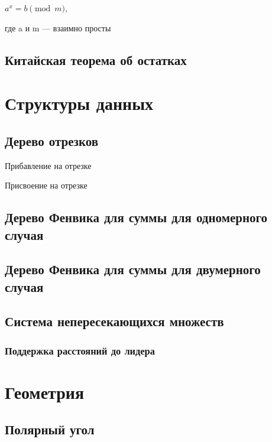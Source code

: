 \documentclass[a4paper]{article}
\begin{document}
\begin{multicols*}{2}
		$a^x = b \pmod m$, 
		
		где a и m — взаимно просты 
		
		\subsection{Китайская теорема об остатках}
		
		
		\section{Структуры данных}
		\subsection{Дерево отрезков}
		
		 Прибавление на отрезке
		 
		 Присвоение на отрезке
		 
		 \subsection{Дерево Фенвика для суммы для одномерного случая}
		 		 
		 \subsection{Дерево Фенвика для суммы для двумерного случая}
		 
		 \subsection{Система непересекающихся множеств}
		 
		 \subsubsection{Поддержка расстояний до лидера}
		 
		 
		 \section{Геометрия}
		 \subsection{Полярный угол}
		 

\end{multicols*}
\end{document}
